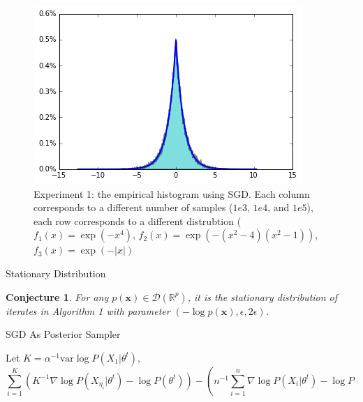 \documentclass[final]{beamer}
\newlength{\onecolwid}
\newcommand{\bx}{\mathbf{x}}
\newcommand{\R}{\mathbb{R}}
\newcommand{\D}{\mathscr{D}}
\newcommand{\N}{\mathscr{N}}
\newcommand{\var}{\mathrm{var}}
\newtheorem{conjecture}{Conjecture}
\begin{document}
\begin{frame}[t]
\begin{columns}[t]
\begin{column}{\onecolwid}
\begin{figure}
    \includegraphics[width=.3\onecolwid]{../figure/case3_step_0.005_iter_1e5.png}
    \caption{Experiment 1: the empirical histogram using SGD. Each column corresponds to a different number of samples ($1e3$, $1e4$, and $1e5$), each row corresponds to a different distrubtion ($f_1(x) = \exp(-x^4)$, $f_2(x) = \exp(-(x^2 - 4)(x^2 - 1))$, $f_3(x) = \exp(-|x|)$}
    \label{Fig:exp1}
\end{figure}


\begin{block}{Stationary Distribution}

\begin{conjecture}
For any $p(\bx)\in \D(\R^p)$, it is the stationary distribution of iterates in Algorithm 1 with parameter $(-\log p(\bx), \epsilon, 2\epsilon)$.
\end{conjecture}

\end{block}



\begin{block}{SGD As Posterior Sampler}

\begin{theorem}
Let $K = \alpha^{-1} \var \log P(X_1|\theta^t)$,
\[
\sum_{i=1}^K (K^{-1}\nabla \log P(X_{\eta_i}|\theta^t) - \log P(\theta^t)) - (n^{-1} \sum_{i=1}^n \nabla \log P(X_i|\theta^t) - \log P(\theta^t)) \sim \N(0, \alpha).
\]
\end{theorem}


\end{block}
\end{column}
\end{columns}
\end{frame}
\end{document}
